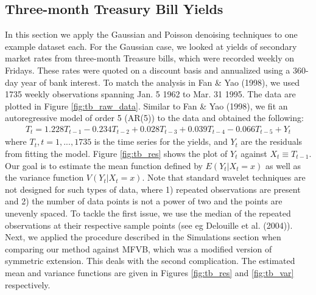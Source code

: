 \documentclass[12pt]{article}
\begin{document}
\subsection{Three-month Treasury Bill Yields}
In this section we apply the Gaussian and Poisson denoising techniques to one example dataset each. For the Gaussian case, we looked at yields of secondary market rates from three-month Treasure bills, which were recorded weekly on Fridays. These rates were quoted on a discount basis and annualized using a 360-day year of bank interest. To match the analysis in Fan \& Yao (1998), we used 1735 weekly observations spanning Jan. 5 1962 to Mar. 31 1995. The data are plotted in Figure \ref{fig:tb_raw_data}. Similar to Fan \& Yao (1998), we fit an autoregressive model of order 5 (AR(5)) to the data and obtained the following:
\begin{eqnarray}
T_t=1.228T_{t-1}-0.234T_{t-2}+0.028T_{t-3}+0.039T_{t-4}-0.066T_{t-5}+Y_t
\end{eqnarray}
where $T_t, t=1,...,1735$ is the time series for the yields, and $Y_t$ are the residuals from fitting the model. Figure \ref{fig:tb_res} shows the plot of $Y_t$ against $X_t\equiv T_{t-1}$. Our goal is to estimate the mean function defined by $E(Y_t|X_t=x)$ as well as the variance function $V(Y_t|X_t=x)$. Note that standard wavelet techniques are not designed for such types of data, where 1) repeated observations are present and 2) the number of data points is not a power of two and the points are unevenly spaced. To tackle the first issue, we use the median of the repeated observations at their respective sample points (see eg Delouille et al. (2004)). Next, we applied the procedure described in the Simulations section when comparing our method against MFVB, which was a modified version of symmetric extension. This deals with the second complication. The estimated mean and variance functions are given in Figures \ref{fig:tb_res} and \ref{fig:tb_var} respectively.
\end{document}
